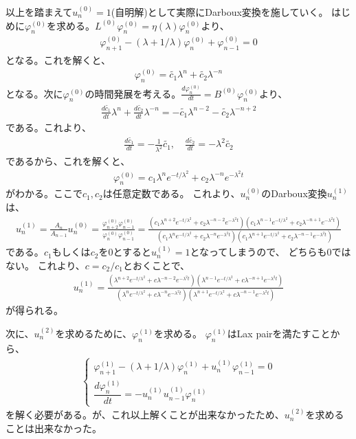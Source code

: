\documentclass{jsarticle}
\begin{document}
\begin{enumerate}
以上を踏まえて$u^{(0)}_{n}=1$(自明解)として実際にDarboux変換を施していく。
はじめに$\varphi_{n}^{(0)}$を求める。$L^{(0)}\varphi_{n}^{(0)}=\eta(\lambda)\varphi_{n}^{(0)}$より、
\begin{align}
\varphi_{n+1}^{(0)}-(\lambda+1/\lambda)\varphi_{n}^{(0)}+\varphi_{n-1}^{(0)}=0
\end{align}
となる。これを解くと、
\begin{align}
\varphi_{n}^{(0)}=\tilde{c_{1}}\lambda^{n}+\tilde{c_{2}}\lambda^{-n}
\end{align}
となる。次に$\varphi_{n}^{(0)}$の時間発展を考える。$\frac{d\varphi_{n}^{(0)}}{dt}=B^{(0)}\varphi_{n}^{(0)}$より、
\begin{align}
\frac{d\tilde{c_{1}}}{dt}\lambda^{n}+\frac{d\tilde{c_{2}}}{dt}\lambda^{-n}
=-\tilde{c_{1}}\lambda^{n-2}-\tilde{c_{2}}\lambda^{-n+2}
\end{align}
である。これより、
\begin{align}
\frac{d\tilde{c_{1}}}{dt}=-\frac{1}{\lambda^{2}}\tilde{c_{1}},\quad
\frac{d\tilde{c_{2}}}{dt}=-\lambda^{2}\tilde{c_{2}}
\end{align}
であるから、これを解くと、
\begin{align}
\varphi_{n}^{(0)}=c_{1}\lambda^{n}e^{-t/\lambda^{2}}+c_{2}\lambda^{-n}e^{-\lambda^{2}t}
\end{align}
がわかる。ここで$c_{1},c_{2}$は任意定数である。
これより、$u_{n}^{(0)}$のDarboux変換$u_{n}^{(1)}$は、
\begin{align}
u_{n}^{(1)}=\frac{A_{n}}{A_{n-1}}u_{n}^{(0)}
=\frac{\varphi_{n+2}^{(0)}\varphi_{n-1}^{(0)}}{\varphi_{n}^{(0)}\varphi_{n-1}^{(0)}}
=\frac{(c_{1}\lambda^{n+2}e^{-t/\lambda^{2}}+c_{2}\lambda^{-n-2}e^{-\lambda^{2}t})(c_{1}\lambda^{n-1}e^{-t/\lambda^{2}}+c_{2}\lambda^{-n+1}e^{-\lambda^{2}t})}{(c_{1}\lambda^{n}e^{-t/\lambda^{2}}+c_{2}\lambda^{-n}e^{-\lambda^{2}t})(c_{1}\lambda^{n+1}e^{-t/\lambda^{2}}+c_{2}\lambda^{-n-1}e^{-\lambda^{2}t})}
\end{align}
である。$c_{1}$もしくは$c_{2}$を$0$とすると$u_{n}^{(1)}=1$となってしまうので、
どちらも$0$ではない。
これより、$c=c_{2}/c_{1}$とおくことで、
\begin{align}
u_{n}^{(1)}=\frac{(\lambda^{n+2}e^{-t/\lambda^{2}}+c\lambda^{-n-2}e^{-\lambda^{2}t})(\lambda^{n-1}e^{-t/\lambda^{2}}+c\lambda^{-n+1}e^{-\lambda^{2}t})}{(\lambda^{n}e^{-t/\lambda^{2}}+c\lambda^{-n}e^{-\lambda^{2}t})(\lambda^{n+1}e^{-t/\lambda^{2}}+c\lambda^{-n-1}e^{-\lambda^{2}t})}
\end{align}
が得られる。

次に、$u_{n}^{(2)}$を求めるために、$\varphi_{n}^{(1)}$を求める。
$\varphi_{n}^{(1)}$はLax pairを満たすことから、
\begin{align}
\left\{
\begin{array}{l}
\varphi_{n+1}^{(1)}-(\lambda+1/\lambda)\varphi_{n}^{(1)}+u_{n}^{(1)}\varphi_{n-1}^{(1)}=0\\
\dfrac{d\varphi_{n}^{(1)}}{dt}=-u_{n}^{(1)}u_{n-1}^{(1)}\varphi_{n}^{(1)}
\end{array}
\right.
\end{align}
を解く必要がある。が、これ以上解くことが出来なかったため、$u_{n}^{(2)}$を求めることは出来なかった。
\end{enumerate}
\end{document}
